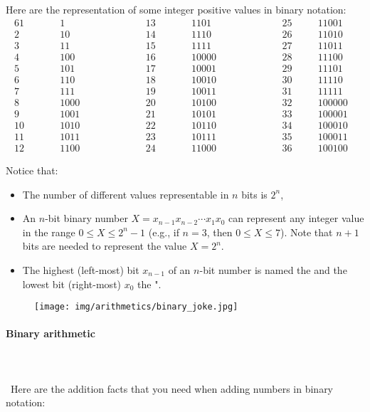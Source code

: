 	Here are the representation of some integer positive values in binary notation:
	\begin{alignat*}{6}
	1&\qquad&1& \qquad\quad\qquad&  13&\qquad&1101&\qquad\quad\qquad &25&\quad&11001&\\
	2&&10&&  14&&1110&&   26&&11010&\\
	3&&11&&  15&&1111&&   27&&11011&\\
	4&&100&& 16&&10000&&   28&&11100&\\
	5&&101&& 17&&10001&&   29&&11101&\\
	6&&110&& 18&&10010&&   30&&11110&\\
	7&&111&& 19&&10011&&   31&&11111&\\
	8&&1000&&20&&10100&&  32&&100000&\\
	9&&1001&&21&&10101&&  33&&100001&\\
	10&&1010&&22&&10110&& 34&&100010&\\
	11&&1011&&23&&10111&& 35&&100011&\\
	12&&1100&&24&&11000&& 36&&100100&
	\end{alignat*}

	Notice that:
	\begin{itemize}
		\item The  number of different values representable in $n$ bits is  $2^n$,
		
		\item An $n$-bit binary number $X=x_{n-1}x_{n-2}\cdots x_1 x_0$ can represent  any integer value in the range $0 \le X \le 2^n-1$ (e.g., if $n=3$,  then $0 \le X \le 7$). Note that $n+1$ bits are needed to represent the value $X=2^n$.
		
		\item The highest (left-most) bit $x_{n-1}$ of an $n$-bit number is named the  and the lowest bit (right-most) $x_0$ the ".
	\end{itemize}
	\begin{figure}[H]
		\centering
		\texttt{[image: img/arithmetics/binary\_joke.jpg]}
	\end{figure}
	
	\paragraph{Binary arithmetic}\mbox{}\\\\\
	Here are the addition facts that you need when adding numbers in binary notation:
	
